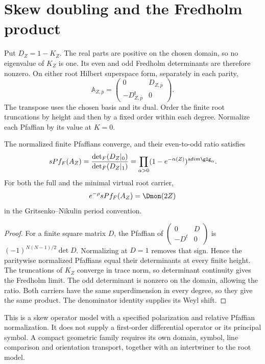 \section{Skew doubling and the Fredholm product}
Put \(D_Z=1-K_Z\). The real parts are positive on the chosen
domain, so no eigenvalue of \(K_Z\) is one. Its even and odd
Fredholm determinants are therefore nonzero. On either root
Hilbert superspace form, separately in each parity,
\[
 \mathbb A_{Z,\bar p}=
 \begin{pmatrix}0&D_{Z,\bar p}\\-D_{Z,\bar p}^{\mathsf t}&0\end{pmatrix}.
\]
The transpose uses the chosen basis and its dual. Order the finite
root truncations by height and then by a fixed order within each
degree. Normalize each Pfaffian by its value at \(K=0\).

\begin{theorem}
The normalized finite Pfaffians converge, and their even-to-odd
ratio satisfies
\[
 \operatorname{sPf}_F(\mathbb A_Z)
 =\frac{\det_F(D_Z|_{\bar0})}{\det_F(D_Z|_{\bar1})}
 =\prod_{\alpha>0}(1-e^{-\alpha(Z)})^{\operatorname{sdim}\gIg_\alpha}.
\]
For both the full and the minimal virtual root carrier,
\[
 e^{-\rho}\operatorname{sPf}_F(\mathbb A_Z)=\Dmon(2Z)
\]
in the Gritsenko--Nikulin period convention.
\end{theorem}
\begin{proof}
For a finite square matrix \(D\), the Pfaffian of
\(\left(\begin{smallmatrix}0&D\\-D^t&0\end{smallmatrix}\right)\)
is \((-1)^{N(N-1)/2}\det D\). Normalizing at \(D=1\)
removes that sign. Hence the paritywise normalized Pfaffians equal
their determinants at every finite height. The truncations of
\(K_Z\) converge in trace norm, so determinant continuity gives
the Fredholm limit. The odd determinant is nonzero on the domain,
allowing the ratio. Both carriers have the same superdimension in
every degree, so they give the same product. The denominator
identity supplies its Weyl shift.
\end{proof}

This is a skew operator model with a specified polarization and
relative Pfaffian normalization. It does not supply a first-order
differential operator or its principal symbol. A compact geometric
family requires its own domain, symbol, line comparison and
orientation transport, together with an intertwiner to the root model.

